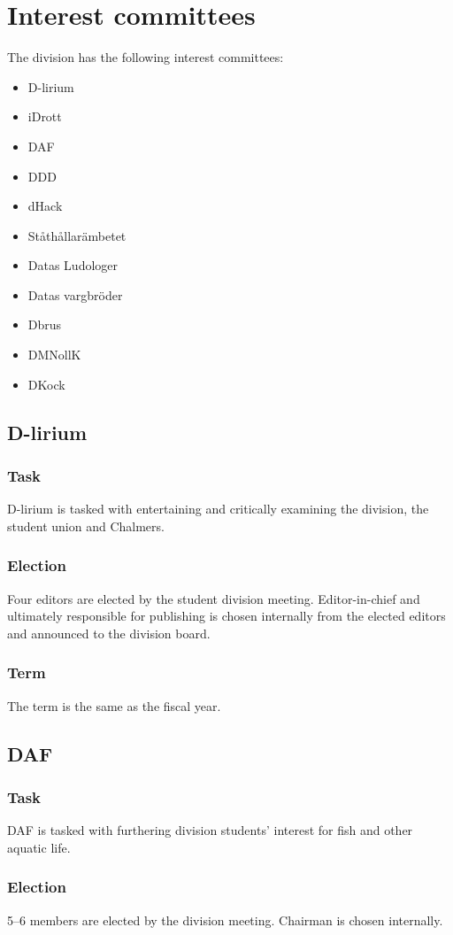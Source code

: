 \section{Interest committees}
The division has the following interest committees:
\begin{itemize}
  \item D-lirium 
  \item iDrott 
  \item DAF 
  \item DDD
  \item dHack
  \item Ståthållarämbetet
  \item Datas Ludologer 
  \item Datas vargbröder
  \item Dbrus
  \item DMNollK
  \item DKock
\end{itemize}

\subsection{D-lirium}
\subsubsection{Task}
D-lirium is tasked with entertaining and critically examining the division, the student union and Chalmers. 
\subsubsection{Election}
Four editors are elected by the student division meeting. Editor-in-chief and ultimately responsible for publishing is chosen internally from the elected editors and announced to the division board.
\subsubsection{Term}
The term is the same as the fiscal year. 

\subsection{DAF}
\subsubsection{Task}
DAF is tasked with furthering division students' interest for fish and other aquatic life. 
\subsubsection{Election}
5--6 members are elected by the division meeting. Chairman is chosen internally. 
